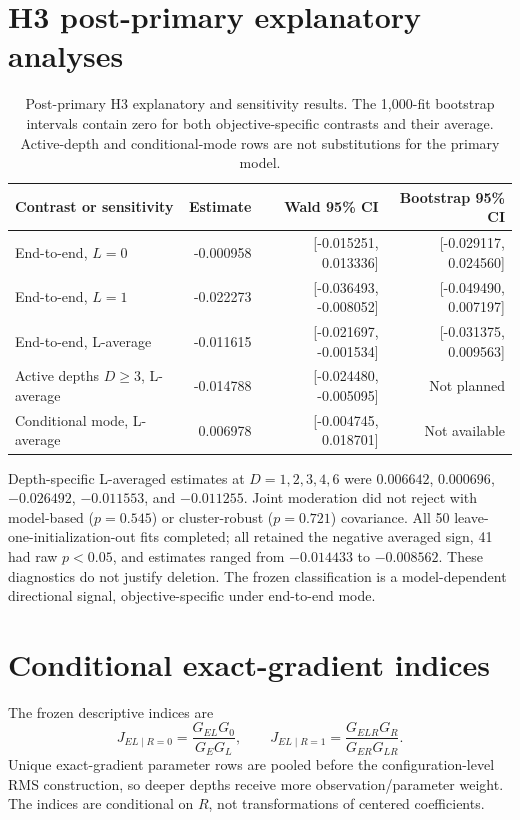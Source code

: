 \documentclass[pdflatex,sn-basic,Numbered]{sn-jnl}
\begin{document}
\section{H3 post-primary explanatory analyses}

\begin{table}[t]
\centering\small
\begin{tabular}{lrrr}
\toprule
Contrast or sensitivity & Estimate & Wald 95\% CI & Bootstrap 95\% CI \\
\midrule
End-to-end, $L=0$ & -0.000958 & [-0.015251, 0.013336] & [-0.029117, 0.024560] \\
End-to-end, $L=1$ & -0.022273 & [-0.036493, -0.008052] & [-0.049490, 0.007197] \\
End-to-end, L-average & -0.011615 & [-0.021697, -0.001534] & [-0.031375, 0.009563] \\
Active depths $D\ge3$, L-average & -0.014788 & [-0.024480, -0.005095] & Not planned \\
Conditional mode, L-average & 0.006978 & [-0.004745, 0.018701] & Not available \\
\bottomrule
\end{tabular}
\caption{Post-primary H3 explanatory and sensitivity results. The 1,000-fit bootstrap intervals contain zero for both objective-specific contrasts and their average. Active-depth and conditional-mode rows are not substitutions for the primary model.}
\end{table}

Depth-specific L-averaged estimates at $D=1,2,3,4,6$ were $0.006642$, $0.000696$, $-0.026492$, $-0.011553$, and $-0.011255$. Joint moderation did not reject with model-based ($p=0.545$) or cluster-robust ($p=0.721$) covariance. All 50 leave-one-initialization-out fits completed; all retained the negative averaged sign, 41 had raw $p<0.05$, and estimates ranged from $-0.014433$ to $-0.008562$. These diagnostics do not justify deletion. The frozen classification is a model-dependent directional signal, objective-specific under end-to-end mode.

\section{Conditional exact-gradient indices}

The frozen descriptive indices are
\[
J_{EL\mid R=0}=\frac{G_{EL}G_0}{G_EG_L},\qquad
J_{EL\mid R=1}=\frac{G_{ELR}G_R}{G_{ER}G_{LR}}.
\]
Unique exact-gradient parameter rows are pooled before the configuration-level RMS construction, so deeper depths receive more observation/parameter weight. The indices are conditional on $R$, not transformations of centered coefficients.
\end{document}
